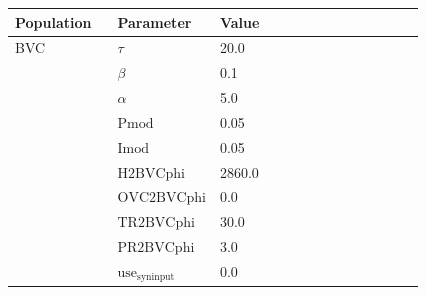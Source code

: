 \documentclass{article}
\begin{document}
\vspace{2ex}

\noindent
\begin{tabularx}{\linewidth}{|p{0.25\linewidth}|p{0.25\linewidth}|X|}\hline
\textbf{Population} & \textbf{Parameter} & \textbf{Value}   \\ \hline

    BVC             & $\tau$        & 20.0  \\ \hline

                 & $\beta$        & 0.1  \\ \hline

                 & $\alpha$        & 5.0  \\ \hline

                 & ${\text{Pmod}}$        & 0.05  \\ \hline

                 & ${\text{Imod}}$        & 0.05  \\ \hline

                 & ${\text{H2BVCphi}}$        & 2860.0  \\ \hline

                 & ${\text{OVC2BVCphi}}$        & 0.0  \\ \hline

                 & ${\text{TR2BVCphi}}$        & 30.0  \\ \hline

                 & ${\text{PR2BVCphi}}$        & 3.0  \\ \hline

                 & ${\text{use}}_{\text{syninput}}$        & 0.0  \\ \hline

\end{tabularx}

\vspace{2ex}
\end{document}
